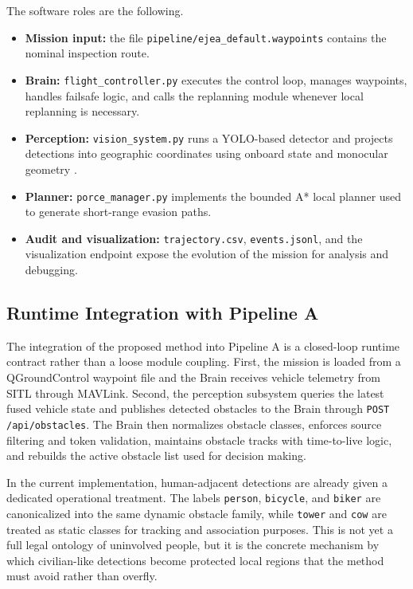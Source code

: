 \documentclass[a4paper,11pt]{article}
\begin{document}
The software roles are the following.
\begin{itemize}[leftmargin=1.3em]
    \item \textbf{Mission input:} the file \texttt{pipeline/ejea\_default.waypoints} contains the nominal inspection route.
    \item \textbf{Brain:} \texttt{flight\_controller.py} executes the control loop, manages waypoints, handles failsafe logic, and calls the replanning module whenever local replanning is necessary.
    \item \textbf{Perception:} \texttt{vision\_system.py} runs a YOLO-based detector and projects detections into geographic coordinates using onboard state and monocular geometry \cite{alaez2023real}.
    \item \textbf{Planner:} \texttt{porce\_manager.py} implements the bounded A* local planner used to generate short-range evasion paths.
    \item \textbf{Audit and visualization:} \texttt{trajectory.csv}, \texttt{events.jsonl}, and the visualization endpoint expose the evolution of the mission for analysis and debugging.
\end{itemize}

\subsection{Runtime Integration with Pipeline A}

The integration of the proposed method into Pipeline A is a closed-loop runtime contract rather than a loose module coupling. First, the mission is loaded from a QGroundControl waypoint file and the Brain receives vehicle telemetry from SITL through MAVLink. Second, the perception subsystem queries the latest fused vehicle state and publishes detected obstacles to the Brain through \texttt{POST /api/obstacles}. The Brain then normalizes obstacle classes, enforces source filtering and token validation, maintains obstacle tracks with time-to-live logic, and rebuilds the active obstacle list used for decision making.

In the current implementation, human-adjacent detections are already given a dedicated operational treatment. The labels \texttt{person}, \texttt{bicycle}, and \texttt{biker} are canonicalized into the same dynamic obstacle family, while \texttt{tower} and \texttt{cow} are treated as static classes for tracking and association purposes. This is not yet a full legal ontology of uninvolved people, but it is the concrete mechanism by which civilian-like detections become protected local regions that the method must avoid rather than overfly.
\end{document}
